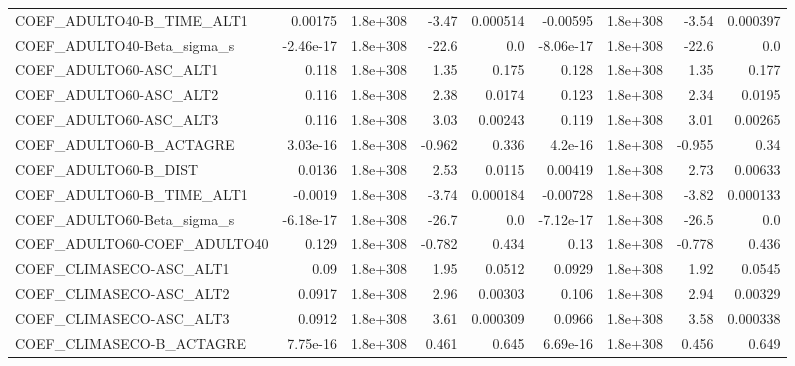 \begin{tabular}{lrrrrrrrr}
COEF\_ADULTO40-B\_TIME\_ALT1         &     0.00175 &     1.8e+308 &     -3.47 & 0.000514 &   -0.00595 &    1.8e+308 &        -3.54 &      0.000397 \\
COEF\_ADULTO40-Beta\_sigma\_s        &   -2.46e-17 &     1.8e+308 &     -22.6 &      0.0 &  -8.06e-17 &    1.8e+308 &        -22.6 &           0.0 \\
COEF\_ADULTO60-ASC\_ALT1            &       0.118 &     1.8e+308 &      1.35 &    0.175 &      0.128 &    1.8e+308 &         1.35 &         0.177 \\
COEF\_ADULTO60-ASC\_ALT2            &       0.116 &     1.8e+308 &      2.38 &   0.0174 &      0.123 &    1.8e+308 &         2.34 &        0.0195 \\
COEF\_ADULTO60-ASC\_ALT3            &       0.116 &     1.8e+308 &      3.03 &  0.00243 &      0.119 &    1.8e+308 &         3.01 &       0.00265 \\
COEF\_ADULTO60-B\_ACTAGRE           &    3.03e-16 &     1.8e+308 &    -0.962 &    0.336 &    4.2e-16 &    1.8e+308 &       -0.955 &          0.34 \\
COEF\_ADULTO60-B\_DIST              &      0.0136 &     1.8e+308 &      2.53 &   0.0115 &    0.00419 &    1.8e+308 &         2.73 &       0.00633 \\
COEF\_ADULTO60-B\_TIME\_ALT1         &     -0.0019 &     1.8e+308 &     -3.74 & 0.000184 &   -0.00728 &    1.8e+308 &        -3.82 &      0.000133 \\
COEF\_ADULTO60-Beta\_sigma\_s        &   -6.18e-17 &     1.8e+308 &     -26.7 &      0.0 &  -7.12e-17 &    1.8e+308 &        -26.5 &           0.0 \\
COEF\_ADULTO60-COEF\_ADULTO40       &       0.129 &     1.8e+308 &    -0.782 &    0.434 &       0.13 &    1.8e+308 &       -0.778 &         0.436 \\
COEF\_CLIMASECO-ASC\_ALT1           &        0.09 &     1.8e+308 &      1.95 &   0.0512 &     0.0929 &    1.8e+308 &         1.92 &        0.0545 \\
COEF\_CLIMASECO-ASC\_ALT2           &      0.0917 &     1.8e+308 &      2.96 &  0.00303 &      0.106 &    1.8e+308 &         2.94 &       0.00329 \\
COEF\_CLIMASECO-ASC\_ALT3           &      0.0912 &     1.8e+308 &      3.61 & 0.000309 &     0.0966 &    1.8e+308 &         3.58 &      0.000338 \\
COEF\_CLIMASECO-B\_ACTAGRE          &    7.75e-16 &     1.8e+308 &     0.461 &    0.645 &   6.69e-16 &    1.8e+308 &        0.456 &         0.649 \\

\end{tabular}
